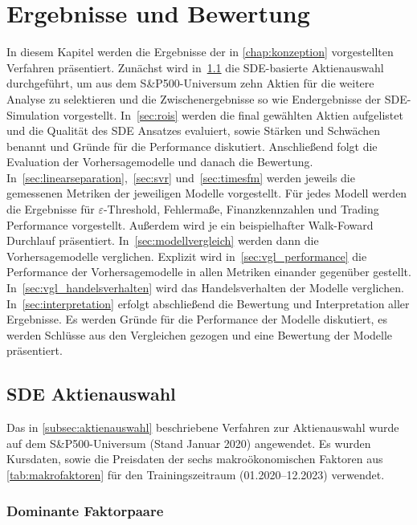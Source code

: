 \chapter{Ergebnisse und Bewertung}\label{chap:ergebnisse_und_bewertung}

In diesem Kapitel werden die Ergebnisse der in \cref{chap:konzeption} vorgestellten Verfahren präsentiert. Zunächst wird in~\cref{sec:sde} die SDE-basierte Aktienauswahl durchgeführt, um aus dem S\&P500-Universum zehn Aktien für die weitere Analyse zu selektieren und die Zwischenergebnisse so wie Endergebnisse der SDE-Simulation vorgestellt. In~\cref{sec:rois} werden die final gewählten Aktien aufgelistet und die Qualität des SDE Ansatzes evaluiert, sowie Stärken und Schwächen benannt und Gründe für die Performance diskutiert. Anschließend folgt die Evaluation der Vorhersagemodelle und danach die Bewertung. In~\cref{sec:linearseparation},~\cref{sec:svr} und~\cref{sec:timesfm} werden jeweils die gemessenen Metriken der jeweiligen Modelle vorgestellt. Für jedes Modell werden die Ergebnisse für $\varepsilon$-Threshold, Fehlermaße, Finanzkennzahlen und Trading Performance vorgestellt. Außerdem wird je ein beispielhafter Walk-Foward Durchlauf präsentiert. In~\cref{sec:modellvergleich} werden dann die Vorhersagemodelle verglichen. Explizit wird in~\cref{sec:vgl_performance} die Performance der Vorhersagemodelle in allen Metriken einander gegenüber gestellt. In~\cref{sec:vgl_handelsverhalten} wird das Handelsverhalten der Modelle verglichen. In~\cref{sec:interpretation} erfolgt abschließend die Bewertung und Interpretation aller Ergebnisse. Es werden Gründe für die Performance der Modelle diskutiert, es werden Schlüsse aus den Vergleichen gezogen und eine Bewertung der Modelle präsentiert.

\section{SDE Aktienauswahl}\label{sec:sde}

Das in \cref{subsec:aktienauswahl} beschriebene Verfahren zur Aktienauswahl wurde auf dem S\&P500-Universum (Stand Januar 2020) angewendet. Es wurden Kursdaten, sowie die Preisdaten der sechs makroökonomischen Faktoren aus \cref{tab:makrofaktoren} für den Trainingszeitraum (01.2020--12.2023) verwendet.

\subsection{Dominante Faktorpaare}

